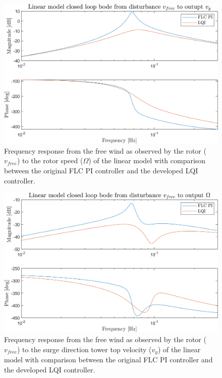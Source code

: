 \begin{figure}[ht]
	\centering
	\includegraphics[width=0.7\linewidth]{Graphics/TestResults/linearModPerf/script_vfreeTovy.png}
	\caption{Frequency response from the free wind as observed by the rotor ($ v_{free} $) to the rotor speed  ($ \Omega $) of the linear model with comparison between the original FLC PI controller and the developed LQI controller.}
	\label{fig:script_vfreeTovy}
\end{figure}

\begin{figure}[ht]
	\centering
	\includegraphics[width=0.7\linewidth]{Graphics/TestResults/linearModPerf/script_vfreeToW.png}
	\caption{Frequency response from the free wind as observed by the rotor ($ v_{free} $) to the surge direction tower top velocity ($ v_y $) of the linear model with comparison between the original FLC PI controller and the developed LQI controller.}
	\label{fig:script_vfreeToW}
\end{figure}

\clearpage
